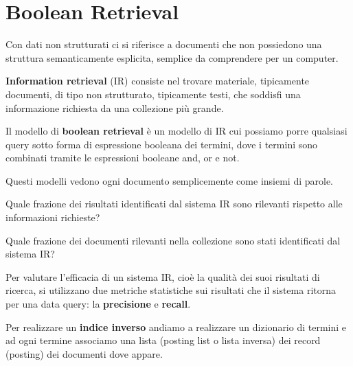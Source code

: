 \documentclass[\main/main.tex]{subfiles}
\begin{document}
\chapter{Boolean Retrieval}
\begin{multicols}{2}
\begin{definition}
    Con dati non strutturati ci si riferisce a documenti che non possiedono una struttura semanticamente esplicita, semplice da comprendere per un computer.
\end{definition}
\begin{definition}
    \textbf{Information retrieval} (IR) consiste nel trovare materiale, tipicamente documenti, di tipo non strutturato, tipicamente testi, che soddisfi una informazione richiesta da una collezione più grande.
\end{definition}
\begin{definition}
    Il modello di \textbf{boolean retrieval} è un modello di IR cui possiamo porre qualsiasi query sotto forma di espressione booleana dei termini, dove i termini sono combinati tramite le espressioni booleane and, or e not.
    
    Questi modelli vedono ogni documento semplicemente come insiemi di parole.
\end{definition}
\begin{definition}[Precisione]
    Quale frazione dei risultati identificati dal sistema IR sono rilevanti rispetto alle informazioni richieste?
\end{definition}
\begin{definition}[Recall]
    Quale frazione dei documenti rilevanti nella collezione sono stati identificati dal sistema IR?
\end{definition}
\begin{definition}
    Per valutare l'efficacia di un sistema IR, cioè la qualità dei suoi risultati di ricerca, si utilizzano due metriche statistiche sui risultati che il sistema ritorna per una data query: la \textbf{precisione} e \textbf{recall}.
\end{definition}
\begin{definition}
    Per realizzare un \textbf{indice inverso} andiamo a realizzare un dizionario di termini e ad ogni termine associamo una lista (posting list o lista inversa) dei record (posting) dei documenti dove appare.
    

\end{definition}
\end{multicols}
\end{document}

